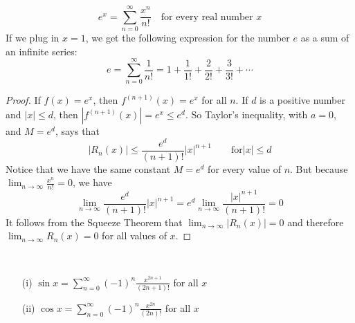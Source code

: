   \begin{definition}
   $$\displaystyle  e^x = \sum_{n=0}^{\infty} \frac{x^n}{n!} \quad \text{for every real number } x$$
   If we plug in $x=1$, we get the following expression for the number $e$ as a sum of an infinite series:
   $$ e = \sum_{n=0}^{\infty} \frac{1}{n!} = 1 + \frac{1}{1!} + \frac{2}{2!} + \frac{3}{3!} + \cdots $$
  \end{definition}
  \begin{proof}\let\qed\relax
    If $f(x) = e^x$, then $f^{(n+1)}(x) = e^x$ for all $n$. If $d$ is a positive number and $|x| \leq d$, then $|f^{(n+1)}(x)| = e^x \leq e^d$. So Taylor's inequality, with $a=0$, and $M=e^d$, says that
    $$ |R_n (x)| \leq \frac{e^d}{(n+1)!}|x|^{n+1} \qquad \text{for} |x| \leq d $$
    Notice that we have the same constant $M = e^d$ for every value of $n$. But because $\displaystyle\lim_{n\to\infty} \frac{x^n}{n!} = 0$, we have
    $$ \lim_{n\to\infty} \frac{e^d}{(n+1)!}|x|^{n+1} = e^d \lim_{n\to\infty} \frac{|x|^{n+1}}{(n+1)!} = 0 $$
    It follows from the Squeeze Theorem that $\lim_{n\to\infty} |R_n (x)| = 0$ and therefore $\lim_{n\to\infty} R_n (x) = 0$ for all values of $x$.
  \end{proof}
  \begin{definition}
    \hphantom{ } \\
    \begin{enumerate}
      \item[(i)] $\displaystyle \sin x = \sum_{n=0}^{\infty} (-1)^n \frac{x^{2n+1}}{(2n+1)!}$ \qquad for all $x$
      \item[(ii)] $\displaystyle \cos x = \sum_{n=0}^{\infty} (-1)^n \frac{x^{2n}}{(2n)!}$ \qquad for all $x$
    \end{enumerate}
  \end{definition}
